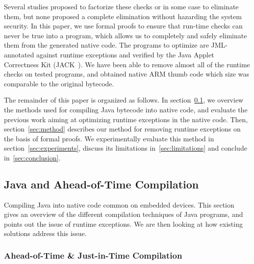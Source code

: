 Several studies proposed to factorize these checks or in some case to eliminate them, but none proposed a complete elimination without hazarding the system security. In this paper, we use formal proofs to ensure that run-time checks can never be true into a program, which allows us to completely and safely eliminate them from the generated native code. The programs to optimize are JML-annotated against runtime exceptions and verified by the Java Applet Correctness Kit (JACK~\cite{BRL-JACK}). We have been able to remove almost all of the runtime checks on tested programs, and obtained native ARM thumb code which size was comparable to the original bytecode.

The remainder of this paper is organized as follows. In section~\ref{sec:sota}, we overview the methods used for compiling Java bytecode into native code, and evaluate the previous work aiming at optimizing runtime exceptions in the native code. Then, section~\ref{sec:method} describes our method for removing runtime exceptions on the basis of formal proofs. We experimentally evaluate this method in section~\ref{sec:experiments}, discuss its limitations in~\ref{sec:limitations} and conclude in~\ref{sec:conclusion}.

\subsection{Java and Ahead-of-Time Compilation}
\label{sec:sota}

Compiling Java into native code common on embedded devices. This section gives an overview of the different compilation techniques of Java programs, and points out the issue of runtime exceptions. We are then looking at how existing solutions address this issue.

\subsubsection{Ahead-of-Time \& Just-in-Time Compilation}

